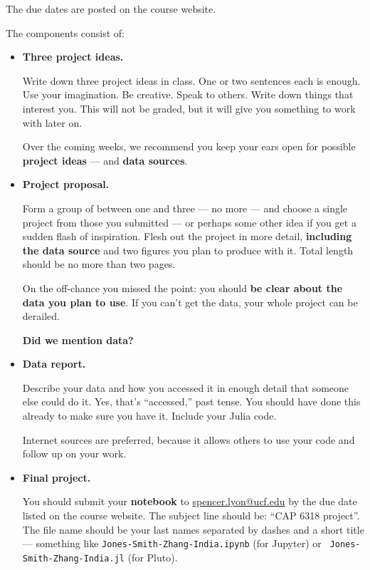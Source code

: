 \documentclass[11pt]{article}
\begin{document}
The due dates are posted on the {course website}.


The components consist of:
\begin{itemize}

\item {\bf Three project ideas.}

Write down three project ideas in class. One or two sentences each is enough.
Use your imagination.  Be creative.  Speak to others. Write down things that
interest you. This will not be graded, but it will give you something to work
with later on.

Over the coming weeks, we recommend you keep your ears open for possible
{\bf project ideas} --- and {\bf data sources\/}.

\item{\bf Project proposal.}

Form a group of between one and three --- no more --- and choose a single
project from those you submitted --- or perhaps some other idea if you get a
sudden flash of inspiration. Flesh out the project in more detail, {\bf
including the data source\/} and two figures you plan to produce with it. Total
length should be no more than two pages.

On the off-chance you missed the point:  you should {\bf be clear about the data
you plan to use\/}. If you can't get the data, your whole project can be
derailed.

{\bf Did we mention data?}

\item {\bf Data report.}

Describe your data and how you accessed it in enough detail that someone else
could do it. Yes, that's ``accessed,'' past tense.  You should have done this
already to make sure you have it. Include your Julia code.

Internet sources are preferred, because it allows others to use your code and
follow up on your work.

\item {\bf Final project.}

You should submit your {\bf notebook\/} to
\href{mailto:spencer.lyon@ucf.edu}{spencer.lyon@ucf.edu} by the due date listed
on the course website. The subject line should be:  ``CAP 6318 project''. The
file name should be your last names separated by dashes and a short title ---
something like {\tt Jones-Smith-Zhang-India.ipynb} (for Jupyter) or {\tt
Jones-Smith-Zhang-India.jl} (for Pluto).


\end{itemize}
\end{document}
